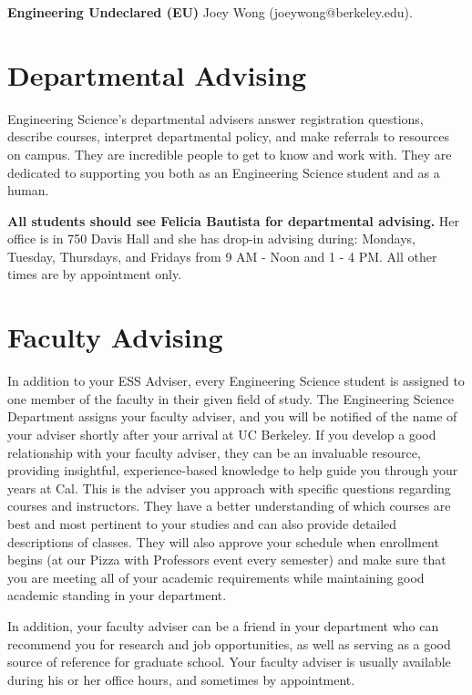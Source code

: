 \textbf{Engineering Undeclared (EU)} Joey Wong ({\selectfont joeywong@berkeley.edu}).

\section*{Departmental Advising}

Engineering Science’s departmental advisers answer registration questions, describe courses, interpret departmental policy, and make referrals to resources on campus. They are incredible people to get to know and work with. They are dedicated to supporting you both as an Engineering Science student and as a human.

\textbf{All students should see Felicia Bautista for departmental advising.} Her office is in 750 Davis Hall and she has drop-in advising during: Mondays, Tuesday, Thursdays, and Fridays from 9 AM - Noon and 1 - 4 PM. All other times are by appointment only.


\section*{Faculty Advising}

In addition to your ESS Adviser, every Engineering Science student is assigned to one member of the faculty in their given field of study.
The Engineering Science Department assigns your faculty adviser, and you will be notified of the name of your adviser shortly after your arrival at UC Berkeley. If you develop a good relationship with your faculty adviser, they can be an invaluable resource, providing insightful, experience-based knowledge to help guide you through your years at Cal. This is the adviser you approach with specific questions regarding courses and instructors. They have a better understanding of which courses are best and most pertinent to your studies and can also provide detailed descriptions of classes. They will also approve your schedule when enrollment begins (at our Pizza with Professors event every semester) and make sure that you are meeting all of your academic requirements while maintaining good academic standing in your department.

In addition, your faculty adviser can be a friend in your department who can recommend you for research and job opportunities, as well as serving as a good source of reference for graduate school. Your faculty adviser is usually available during his or her office hours, and sometimes by appointment.

